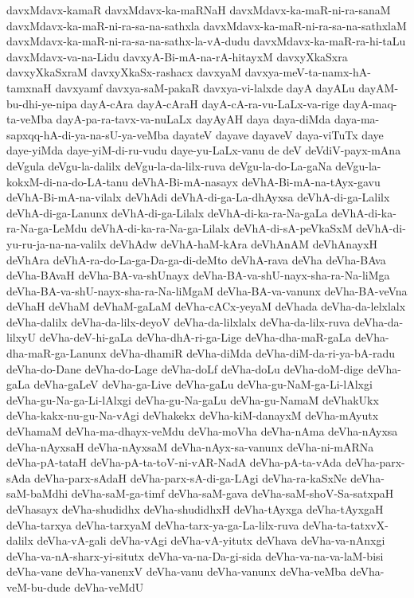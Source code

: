 {davxMdavx-kamaR
davxMdavx-ka-maRNaH
davxMdavx-ka-maR-ni-ra-sanaM
davxMdavx-ka-maR-ni-ra-sa-na-sathxla
davxMdavx-ka-maR-ni-ra-sa-na-sathxlaM
davxMdavx-ka-maR-ni-ra-sa-na-sathx-la-vA-dudu
davxMdavx-ka-maR-ra-hi-taLu
davxMdavx-va-na-Lidu
davxyA-Bi-mA-na-rA-hitayxM
davxyXkaSxra
davxyXkaSxraM
davxyXkaSx-rashacx
davxyaM
davxya-meV-ta-namx-hA-tamxnaH
davxyamf
davxya-saM-pakaR
davxya-vi-lalxde
dayA
dayALu
dayAM-bu-dhi-ye-nipa
dayA-cAra
dayA-cAraH
dayA-cA-ra-vu-LaLx-va-rige
dayA-maq-ta-veMba
dayA-pa-ra-tavx-va-nuLaLx
dayAyAH
daya
daya-diMda
daya-ma-sapxqq-hA-di-ya-na-sU-ya-veMba
dayateV
dayave
dayaveV
daya-viTuTx
daye
daye-yiMda
daye-yiM-di-ru-vudu
daye-yu-LaLx-vanu
de
deV
deVdiV-payx-mAna
deVgula
deVgu-la-dalilx
deVgu-la-da-lilx-ruva
deVgu-la-do-La-gaNa
deVgu-la-kokxM-di-na-do-LA-tanu
deVhA-Bi-mA-nasayx
deVhA-Bi-mA-na-tAyx-gavu
deVhA-Bi-mA-na-vilalx
deVhAdi
deVhA-di-ga-La-dhAyxsa
deVhA-di-ga-Lalilx
deVhA-di-ga-Lanunx
deVhA-di-ga-Lilalx
deVhA-di-ka-ra-Na-gaLa
deVhA-di-ka-ra-Na-ga-LeMdu
deVhA-di-ka-ra-Na-ga-Lilalx
deVhA-di-sA-peVkaSxM
deVhA-di-yu-ru-ja-na-na-valilx
deVhAdw
deVhA-haM-kAra
deVhAnAM
deVhAnayxH
deVhAra
deVhA-ra-do-La-ga-Da-ga-di-deMto
deVhA-rava
deVha
deVha-BAva
deVha-BAvaH
deVha-BA-va-shUnayx
deVha-BA-va-shU-nayx-sha-ra-Na-liMga
deVha-BA-va-shU-nayx-sha-ra-Na-liMgaM
deVha-BA-va-vanunx
deVha-BA-veVna
deVhaH
deVhaM
deVhaM-gaLaM
deVha-cACx-yeyaM
deVhada
deVha-da-lelxlalx
deVha-dalilx
deVha-da-lilx-deyoV
deVha-da-lilxlalx
deVha-da-lilx-ruva
deVha-da-lilxyU
deVha-deV-hi-gaLa
deVha-dhA-ri-ga-Lige
deVha-dha-maR-gaLa
deVha-dha-maR-ga-Lanunx
deVha-dhamiR
deVha-diMda
deVha-diM-da-ri-ya-bA-radu
deVha-do-Dane
deVha-do-Lage
deVha-doLf
deVha-doLu
deVha-doM-dige
deVha-gaLa
deVha-gaLeV
deVha-ga-Live
deVha-gaLu
deVha-gu-NaM-ga-Li-lAlxgi
deVha-gu-Na-ga-Li-lAlxgi
deVha-gu-Na-gaLu
deVha-gu-NamaM
deVhakUkx
deVha-kakx-nu-gu-Na-vAgi
deVhakekx
deVha-kiM-danayxM
deVha-mAyutx
deVhamaM
deVha-ma-dhayx-veMdu
deVha-moVha
deVha-nAma
deVha-nAyxsa
deVha-nAyxsaH
deVha-nAyxsaM
deVha-nAyx-sa-vanunx
deVha-ni-mARNa
deVha-pA-tataH
deVha-pA-ta-toV-ni-vAR-NadA
deVha-pA-ta-vAda
deVha-parx-sAda
deVha-parx-sAdaH
deVha-parx-sA-di-ga-LAgi
deVha-ra-kaSxNe
deVha-saM-baMdhi
deVha-saM-ga-timf
deVha-saM-gava
deVha-saM-shoV-Sa-satxpaH
deVhasayx
deVha-shudidhx
deVha-shudidhxH
deVha-tAyxga
deVha-tAyxgaH
deVha-tarxya
deVha-tarxyaM
deVha-tarx-ya-ga-La-lilx-ruva
deVha-ta-tatxvX-dalilx
deVha-vA-gali
deVha-vAgi
deVha-vA-yitutx
deVhava
deVha-va-nAnxgi
deVha-va-nA-sharx-yi-situtx
deVha-va-na-Da-gi-sida
deVha-va-na-va-laM-bisi
deVha-vane
deVha-vanenxV
deVha-vanu
deVha-vanunx
deVha-veMba
deVha-veM-bu-dude
deVha-veMdU
}
